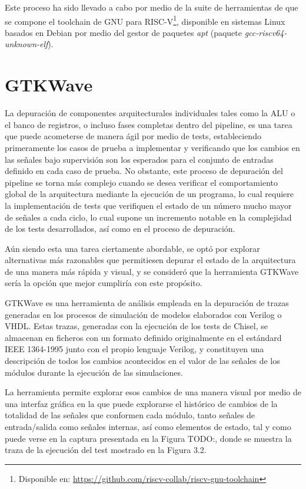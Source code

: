 Este proceso ha sido llevado a cabo por medio de la suite de herramientas de que se compone el toolchain de GNU para RISC-V\footnote{Disponible en: \url{https://github.com/riscv-collab/riscv-gnu-toolchain}}, disponible en sistemas Linux basados en Debian por medio del gestor de paquetes \textit{apt} (paquete \textit{gcc-riscv64-unknown-elf}).

\section{GTKWave}

La depuración de componentes arquitecturales individuales tales como la ALU o el banco de registros, o incluso fases completas dentro del pipeline, es una tarea que puede acometerse de manera ágil por medio de tests, estableciendo primeramente los casos de prueba a implementar y verificando que los cambios en las señales bajo supervisión son los esperados para el conjunto de entradas definido en cada caso de prueba. No obstante, este proceso de depuración del pipeline se torna más complejo cuando se desea verificar el comportamiento global de la arquitectura mediante la ejecución de un programa, lo cual requiere la implementación de tests que verifiquen el estado de un número mucho mayor de señales a cada ciclo, lo cual supone un incremento notable en la complejidad de los tests desarrollados, así como en el proceso de depuración.

Aún siendo esta una tarea ciertamente abordable, se optó por explorar alternativas más razonables que permitiesen depurar el estado de la arquitectura de una manera más rápida y visual, y se consideró que la herramienta GTKWave sería la opción que mejor cumpliría con este propósito.

GTKWave es una herramienta de análisis empleada en la depuración de trazas generadas en los procesos de simulación de modelos elaborados con Verilog o VHDL. Estas trazas, generadas con la ejecución de los tests de Chisel, se almacenan en ficheros con un formato definido originalmente en el estándard IEEE 1364-1995 junto con el propio lenguaje Verilog\cite{IEEE1364}, y constituyen una descripción de todos los cambios acontecidos en el valor de las señales de los módulos durante la ejecución de las simulaciones.

La herramienta permite explorar esos cambios de una manera visual por medio de una interfaz gráfica en la que puede explorarse el histórico de cambios de la totalidad de las señales que conformen cada módulo, tanto señales de entrada/salida como señales internas, así como elementos de estado, tal y como puede verse en la captura presentada en la Figura TODO:, donde se muestra la traza de la ejecución del test mostrado en la Figura 3.2.






